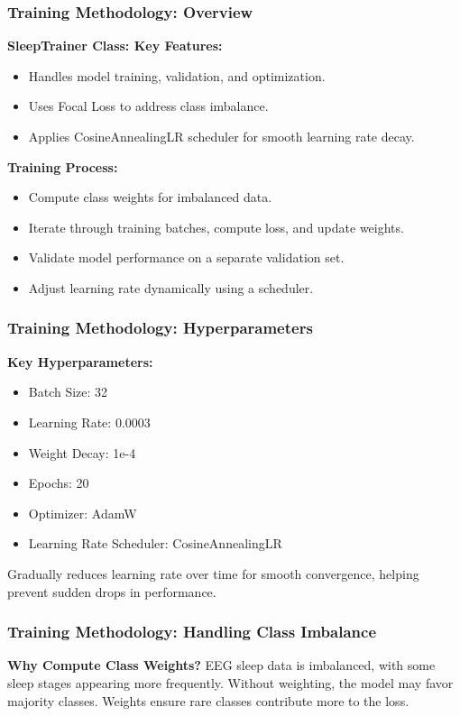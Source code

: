 \subsubsection{Training Methodology: Overview}
\textbf{SleepTrainer Class: Key Features:}
\begin{itemize}
    \item Handles model training, validation, and optimization.
    \item Uses Focal Loss to address class imbalance.
    \item Applies CosineAnnealingLR scheduler for smooth learning rate decay.
\end{itemize}

\textbf{Training Process:}
\begin{itemize}
    \item Compute class weights for imbalanced data.
    \item Iterate through training batches, compute loss, and update weights.
    \item Validate model performance on a separate validation set.
    \item Adjust learning rate dynamically using a scheduler.
\end{itemize}

\subsubsection{Training Methodology: Hyperparameters}
\textbf{Key Hyperparameters:}
\begin{itemize}
    \item Batch Size: 32
    \item Learning Rate: 0.0003
    \item Weight Decay: 1e-4
    \item Epochs: 20
    \item Optimizer: AdamW
    \item Learning Rate Scheduler: CosineAnnealingLR
\end{itemize}
Gradually reduces learning rate over time for smooth convergence, helping prevent sudden drops in performance.

\subsubsection{Training Methodology: Handling Class Imbalance}
\textbf{Why Compute Class Weights?}  
EEG sleep data is imbalanced, with some sleep stages appearing more frequently. Without weighting, the model may favor majority classes. Weights ensure rare classes contribute more to the loss.

